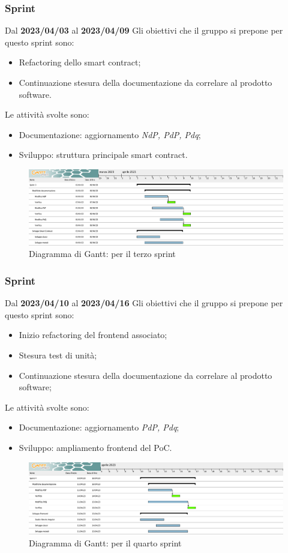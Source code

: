 \subsubsection{ Sprint}
Dal \textbf{2023/04/03} al \textbf{2023/04/09}
\newline
Gli obiettivi che il gruppo si prepone per questo sprint sono:
\begin{itemize}
    \item Refactoring dello smart contract;
    \item Continuazione stesura della documentazione da correlare al prodotto software.
\end{itemize}
Le attività svolte sono:
\begin{itemize}
    \item Documentazione: aggiornamento \textit{NdP, PdP, Pdq};
    \item Sviluppo: struttura principale smart contract.
\end{itemize}
\begin{figure}[H]
    \centering
    \includegraphics[scale=0.32]{src/img/Sprint 3.png}
    \caption{Diagramma di Gantt: per il terzo sprint}
\end{figure}
\subsubsection{ Sprint}
Dal \textbf{2023/04/10} al \textbf{2023/04/16}
\newline
Gli obiettivi che il gruppo si prepone per questo sprint sono:
\begin{itemize}
    \item Inizio refactoring del frontend associato;
    \item Stesura test di unità;
    \item Continuazione stesura della documentazione da correlare al prodotto software;
\end{itemize}
Le attività svolte sono:
\begin{itemize}
    \item Documentazione: aggiornamento \textit{PdP, Pdq};
    \item Sviluppo: ampliamento frontend del PoC.
\end{itemize}
\begin{figure}[H]
    \centering
    \includegraphics[scale=0.32]{src/img/Sprint 4.png}
    \caption{Diagramma di Gantt: per il quarto sprint}
\end{figure}
